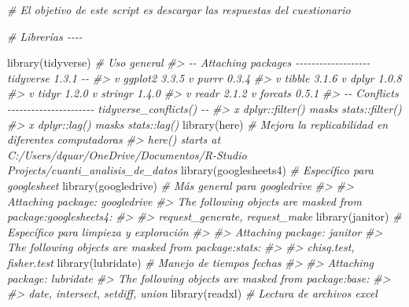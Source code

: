 \documentclass[
]{book}
\newenvironment{Shaded}{\begin{snugshade}}{\end{snugshade}}
\newcommand{\CommentTok}[1]{\textcolor[rgb]{0.56,0.35,0.01}{\textit{#1}}}
\newcommand{\FunctionTok}[1]{\textcolor[rgb]{0.00,0.00,0.00}{#1}}
\newcommand{\NormalTok}[1]{#1}
\theoremstyle{definition}
\theoremstyle{definition}
\theoremstyle{definition}
\theoremstyle{definition}
\theoremstyle{remark}
\begin{document}
\begin{Shaded}
\begin{Highlighting}[]
\CommentTok{\# El objetivo de este script es descargar las respuestas del cuestionario}

\CommentTok{\# Librerías {-}{-}{-}{-}}

\FunctionTok{library}\NormalTok{(tidyverse) }\CommentTok{\# Uso general}
\CommentTok{\#\textgreater{} {-}{-} Attaching packages {-}{-}{-}{-}{-}{-}{-}{-}{-}{-}{-}{-}{-}{-}{-}{-}{-}{-}{-} tidyverse 1.3.1 {-}{-}}
\CommentTok{\#\textgreater{} v ggplot2 3.3.5     v purrr   0.3.4}
\CommentTok{\#\textgreater{} v tibble  3.1.6     v dplyr   1.0.8}
\CommentTok{\#\textgreater{} v tidyr   1.2.0     v stringr 1.4.0}
\CommentTok{\#\textgreater{} v readr   2.1.2     v forcats 0.5.1}
\CommentTok{\#\textgreater{} {-}{-} Conflicts {-}{-}{-}{-}{-}{-}{-}{-}{-}{-}{-}{-}{-}{-}{-}{-}{-}{-}{-}{-}{-}{-} tidyverse\_conflicts() {-}{-}}
\CommentTok{\#\textgreater{} x dplyr::filter() masks stats::filter()}
\CommentTok{\#\textgreater{} x dplyr::lag()    masks stats::lag()}
\FunctionTok{library}\NormalTok{(here) }\CommentTok{\# Mejora la replicabilidad en diferentes computadoras}
\CommentTok{\#\textgreater{} here() starts at C:/Users/dquar/OneDrive/Documentos/R{-}Studio Projects/cuanti\_analisis\_de\_datos}
\FunctionTok{library}\NormalTok{(googlesheets4) }\CommentTok{\# Específico para googlesheet}
\FunctionTok{library}\NormalTok{(googledrive) }\CommentTok{\# Más general para googledrive}
\CommentTok{\#\textgreater{} }
\CommentTok{\#\textgreater{} Attaching package: \textquotesingle{}googledrive\textquotesingle{}}
\CommentTok{\#\textgreater{} The following objects are masked from \textquotesingle{}package:googlesheets4\textquotesingle{}:}
\CommentTok{\#\textgreater{} }
\CommentTok{\#\textgreater{}     request\_generate, request\_make}
\FunctionTok{library}\NormalTok{(janitor) }\CommentTok{\# Específico para limpieza y exploración}
\CommentTok{\#\textgreater{} }
\CommentTok{\#\textgreater{} Attaching package: \textquotesingle{}janitor\textquotesingle{}}
\CommentTok{\#\textgreater{} The following objects are masked from \textquotesingle{}package:stats\textquotesingle{}:}
\CommentTok{\#\textgreater{} }
\CommentTok{\#\textgreater{}     chisq.test, fisher.test}
\FunctionTok{library}\NormalTok{(lubridate) }\CommentTok{\# Manejo de tiempos fechas}
\CommentTok{\#\textgreater{} }
\CommentTok{\#\textgreater{} Attaching package: \textquotesingle{}lubridate\textquotesingle{}}
\CommentTok{\#\textgreater{} The following objects are masked from \textquotesingle{}package:base\textquotesingle{}:}
\CommentTok{\#\textgreater{} }
\CommentTok{\#\textgreater{}     date, intersect, setdiff, union}
\FunctionTok{library}\NormalTok{(readxl) }\CommentTok{\# Lectura de archivos excel}


\end{Highlighting}
\end{Shaded}
\end{document}
